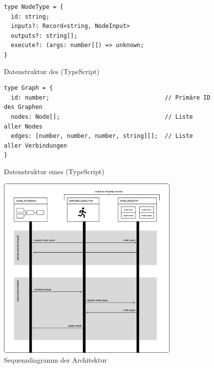 \documentclass[ngerman]{article}
\begin{document}
\begin{figure}[htbp]
  \begin{code}
    \begin{verbatim}
type NodeType = {
  id: string;
  inputs?: Record<string, NodeInput>
  outputs?: string[];
  execute?: (args: number[]) => unknown;
}
    \end{verbatim}
  \end{code}

  \caption{Datenstruktur des  (TypeScript)}
  \label{sec:data_node_type}

\end{figure}

\begin{figure}[htbp]
  \begin{code}
    \begin{verbatim}
type Graph = {
  id: number;                                 // Primäre ID des Graphen
  nodes: Node[];                              // Liste aller Nodes
  edges: [number, number, number, string][];  // Liste aller Verbindungen
}
    \end{verbatim}
  \end{code}

  \caption{Datenstruktur eines  (TypeScript)}
  \label{fig:data_node_graph}

\end{figure}

\begin{figure}
    \centering
    \includegraphics[width=0.8\textwidth]{graphics/OVERVIEW_SEQUENCE.pdf}
    \caption{Sequenzdiagramm der Architektur}
    \label{fig:your_label}
\end{figure}
\end{document}
